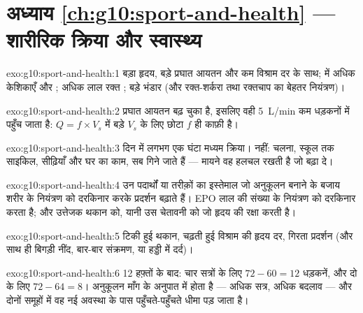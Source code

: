 \section*{अध्याय \ref{ch:g10:sport-and-health} --- शारीरिक क्रिया और स्वास्थ्य}

\begin{solution}{exo:g10:sport-and-health:1}
बड़ा हृदय, बड़े प्रघात आयतन और कम विश्राम दर के साथ;  में अधिक
केशिकाएँ और ; अधिक लाल रक्त ; बड़े  भंडार
(और रक्त-शर्करा तथा रक्तचाप का बेहतर नियंत्रण)।
\end{solution}

\begin{solution}{exo:g10:sport-and-health:2}
प्रघात आयतन बढ़ चुका है, इसलिए वही \qty{5}{L/min} कम धड़कनों में पहुँच
जाता है: $Q = f \times V_s$ में बड़े $V_s$ के लिए छोटा $f$ ही काफ़ी
है।
\end{solution}

\begin{solution}{exo:g10:sport-and-health:3}
दिन में लगभग एक घंटा मध्यम क्रिया। नहीं: चलना, स्कूल तक साइकिल, सीढ़ियाँ
और घर का काम, सब गिने जाते हैं --- मायने वह हलचल रखती है जो 
बढ़ा दे।
\end{solution}

\begin{solution}{exo:g10:sport-and-health:4}
उन पदार्थों या तरीक़ों का इस्तेमाल जो अनुकूलन बनाने के बजाय शरीर के
नियंत्रण को दरकिनार करके प्रदर्शन बढ़ाते हैं। EPO लाल  की संख्या
के नियंत्रण को दरकिनार करता है; और उत्तेजक थकान को, यानी उस चेतावनी को जो
हृदय की रक्षा करती है।
\end{solution}

\begin{solution}{exo:g10:sport-and-health:5}
टिकी हुई थकान, चढ़ती हुई विश्राम की हृदय दर, गिरता प्रदर्शन (और साथ ही
बिगड़ी नींद, बार-बार संक्रमण,  या हड्डी में दर्द)।
\end{solution}

\begin{solution}{exo:g10:sport-and-health:6}
12 हफ़्तों के बाद: चार सत्रों के लिए $72 - 60 = 12$ धड़कनें, और दो के लिए
$72 - 64 = 8$। अनुकूलन माँग के अनुपात में होता है --- अधिक सत्र, अधिक
बदलाव --- और दोनों समूहों में वह नई अवस्था के पास पहुँचते-पहुँचते धीमा पड़
जाता है।
\end{solution}

